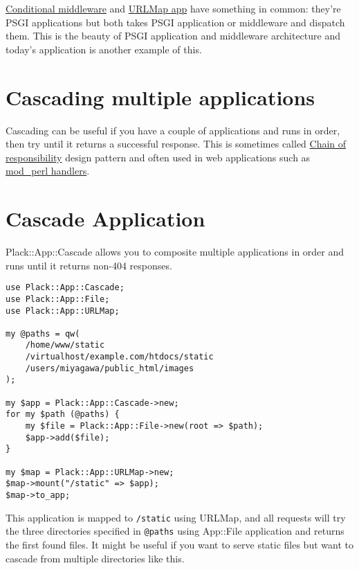 \href{http://advent.plackperl.org/2009/12/day-18-load-middleware-conditionally.html}{Conditional
middleware} and
\href{http://advent.plackperl.org/2009/12/day-12-maps-multiple-apps-with-mount-and-urlmap.html}{URLMap
app} have something in common: they're PSGI applications but both takes
PSGI application or middleware and dispatch them. This is the beauty of
PSGI application and middleware architecture and today's application is
another example of this.

\section{Cascading multiple
applications}\label{cascading-multiple-applications}

Cascading can be useful if you have a couple of applications and runs in
order, then try until it returns a successful response. This is
sometimes called
\href{http://en.wikipedia.org/wiki/Chain-of-responsibility_pattern}{Chain
of responsibility} design pattern and often used in web applications
such as
\href{http://perl.apache.org/docs/2.0/user/handlers/intro.html}{mod\_perl
handlers}.

\section{Cascade Application}\label{cascade-application}

Plack::App::Cascade allows you to composite multiple applications in
order and runs until it returns non-404 responses.

\begin{lstlisting}
use Plack::App::Cascade;
use Plack::App::File;
use Plack::App::URLMap;

my @paths = qw(
    /home/www/static
    /virtualhost/example.com/htdocs/static
    /users/miyagawa/public_html/images
);

my $app = Plack::App::Cascade->new;
for my $path (@paths) {
    my $file = Plack::App::File->new(root => $path);
    $app->add($file);
}

my $map = Plack::App::URLMap->new;
$map->mount("/static" => $app);
$map->to_app;
\end{lstlisting}

This application is mapped to \lstinline!/static! using URLMap, and all
requests will try the three directories specified in \lstinline!@paths!
using App::File application and returns the first found files. It might
be useful if you want to serve static files but want to cascade from
multiple directories like this.

